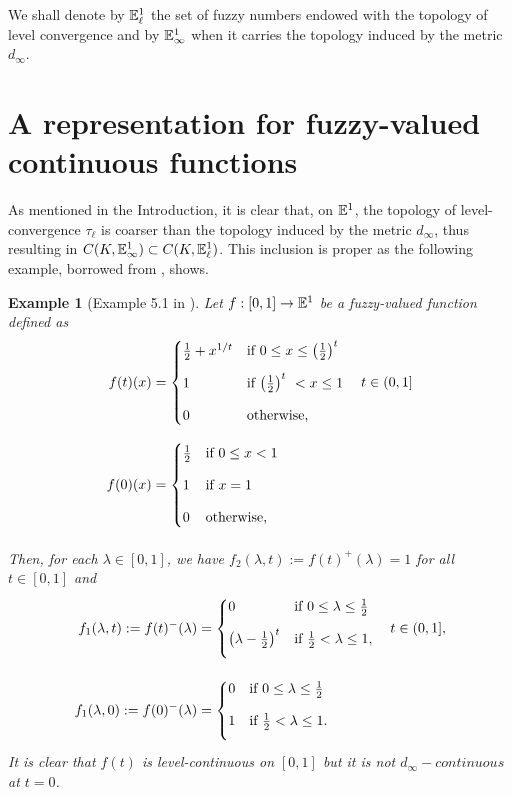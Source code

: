 \documentclass{amsart}
\newtheorem{example}[theorem]{Example}
\newcommand{\fn}{\mathbb{E}\sp{1}}
\begin{document}
\medskip
 We shall denote by $\fn_{\ell}$ the set of fuzzy numbers endowed with the topology of level convergence and by  $\fn_{\infty}$ when it carries the topology induced by the metric $d_{\infty}$.





\section{A representation for fuzzy-valued continuous functions}


As mentioned in the Introduction, it is clear that, on $\fn$,  the topology of level-convergence $\tau_{\ell}$ is coarser than the topology induced by the metric $d_{\infty}$, thus resulting in $C(K,\fn_{\infty})\subset C(K,\fn_{\ell})$. This inclusion is proper as the following example, borrowed from \cite{FH:04}, shows.



\begin{example}[Example 5.1 in \cite{FH:04}]\label{ex:levelcont1}
{\em Let $f:[0,1]\rightarrow \fn$ be a fuzzy-valued function defined as
\begin{align*}
f(t)(x)&=\begin{cases}
\frac{1}{2}+x^{1/t} & \text {if $0\leq x \leq \left(\frac{1}{2}\right)^t$}\\[2ex]
1  & \text {if $\left(\frac{1}{2}\right)^t\ <  x \leq 1$}\\[2ex]
0  & \text {otherwise,}
\end{cases} \quad t\in(0,1]\\[2ex]
f(0)(x)&=\begin{cases}
\frac{1}{2} & \text {if $0\leq x < 1$}\\[2ex]
1  & \text {if $ x=1$}\\[2ex]
0  & \text {otherwise,}
\end{cases} \\[2ex]
\end{align*}
Then, for each $\lambda\in[0,1]$, we have $f_2(\lambda,t):=f(t)^+(\lambda)=1$ for all $t\in [0,1]$ and
\begin{align*}
f_1(\lambda,t):=f(t)^-(\lambda)&=\begin{cases}
0& \text {if $0\leq \lambda \leq \frac{1}{2}$}\\[2ex]
\left(\lambda-\frac{1}{2}\right)^t  & \text {if $\frac{1}{2} < \lambda  \leq 1,$}
\\[2ex]
\end{cases} \quad t\in(0,1],
\\[2ex]
f_1(\lambda,0):=f(0)^-(\lambda)&=\begin{cases}
0 & \text {if $0\leq \lambda \leq \frac{1}{2}$}\\[2ex]
1  & \text {if $ \frac{1}{2}<\lambda\leq 1.$}\\[2ex]
\end{cases}
\end{align*}
It is clear that $f(t)$ is level-continuous on $[0,1]$ but it is not $d_{\infty}-continuous$ at $t=0$.}
\end{example}
\end{document}
